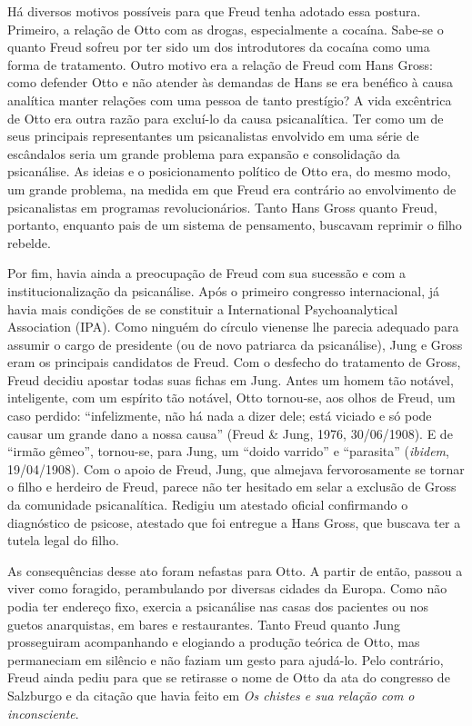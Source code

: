 Há diversos motivos possíveis para que Freud tenha adotado essa postura.
Primeiro, a relação de Otto com as drogas, especialmente a cocaína.
Sabe-se o quanto Freud sofreu por ter sido um dos introdutores da
cocaína como uma forma de tratamento. Outro motivo era a relação de
Freud com Hans Gross: como defender Otto e não atender às demandas de
Hans se era benéfico à causa analítica manter relações com uma pessoa de
tanto prestígio? A vida excêntrica de Otto era outra razão para
excluí-lo da causa psicanalítica. Ter como um de seus principais
representantes um psicanalistas envolvido em uma série de escândalos
seria um grande problema para expansão e consolidação da psicanálise. As
ideias e o posicionamento político de Otto era, do mesmo modo, um grande
problema, na medida em que Freud era contrário ao envolvimento de
psicanalistas em programas revolucionários. Tanto Hans Gross quanto
Freud, portanto, enquanto pais de um sistema de pensamento, buscavam
reprimir o filho rebelde.

Por fim, havia ainda a preocupação de Freud com sua sucessão e com a
institucionalização da psicanálise. Após o primeiro congresso
internacional, já havia mais condições de se constituir a International
Psychoanalytical Association (IPA). Como ninguém do círculo vienense lhe
parecia adequado para assumir o cargo de presidente (ou de novo
patriarca da psicanálise), Jung e Gross eram os principais candidatos de
Freud. Com o desfecho do tratamento de Gross, Freud decidiu apostar
todas suas fichas em Jung. Antes um homem tão notável, inteligente, com
um espírito tão notável, Otto tornou-se, aos olhos de Freud, um caso
perdido: ``infelizmente, não há nada a dizer dele; está viciado e só
pode causar um grande dano a nossa causa'' (Freud \& Jung, 1976,
30/06/1908). E de ``irmão gêmeo'', tornou-se, para Jung, um ``doido
varrido'' e ``parasita'' (\emph{ibidem}, 19/04/1908). Com o apoio de
Freud, Jung, que almejava fervorosamente se tornar o filho e herdeiro de
Freud, parece não ter hesitado em selar a exclusão de Gross da
comunidade psicanalítica. Redigiu um atestado oficial confirmando o
diagnóstico de psicose, atestado que foi entregue a Hans Gross, que
buscava ter a tutela legal do filho.

As consequências desse ato foram nefastas para Otto. A partir de então,
passou a viver como foragido, perambulando por diversas cidades da
Europa. Como não podia ter endereço fixo, exercia a psicanálise nas
casas dos pacientes ou nos guetos anarquistas, em bares e restaurantes.
Tanto Freud quanto Jung prosseguiram acompanhando e elogiando a produção
teórica de Otto, mas permaneciam em silêncio e não faziam um gesto para
ajudá-lo. Pelo contrário, Freud ainda pediu para que se retirasse o nome
de Otto da ata do congresso de Salzburgo e da citação que havia feito em
\emph{Os chistes e sua relação com o inconsciente}.

